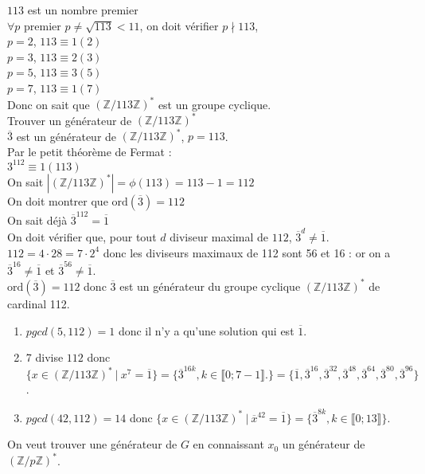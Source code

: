 \documentclass[a4paper,10pt]{book} %
\newcommand{\Z}{\mathbb{Z}}
\newcommand{\abs}[1]{\left|#1\right|}
\newcommand{\tq}{~|~}
\newcommand{\ord}{\mathrm{ord}}
\begin{document}
$113$ est un nombre premier \\
$\forall p$ premier $p\neq \sqrt{113} < 11$, on doit vérifier $p \nmid 113$,\\
$p=2$, $113 \equiv 1(2)$\\
$p=3$, $113 \equiv 2(3)$\\
$p=5$, $113 \equiv 3(5)$\\
$p=7$, $113 \equiv 1(7)$\\
Donc on sait que $(\Z/113\Z)^*$ est un groupe cyclique.\\
Trouver un générateur de $(\Z/113\Z)^*$ \\
$\overline{3}$ est un générateur de $(\Z/113\Z)^*$, $p=113$.\\
Par le petit théorème de Fermat :\\
$3^112 \equiv 1(113)$\\
On sait $\abs{(\Z/113\Z)^*} = \phi(113)=113-1=112$\\
On doit montrer que $\ord(\overline{3})=112$ \\
On sait déjà $\overline{3}^112=\overline{1}$\\

On doit vérifier que, pour tout $d$ diviseur maximal de $112$, $\overline{3}^{d}\neq \overline{1}$.\\

$112=4\cdot 28=7\cdot 2^4$ donc les diviseurs maximaux de 112 sont 56 et 16 : or on a $\overline{3}^{16}\neq \overline{1}$ et $\overline{3}^{56}\neq \overline{1}$.\\

$\ord(\overline{3})=112$ donc $\overline{3}$ est un générateur du groupe cyclique $(\Z/113\Z)^*$ de cardinal 112.

\begin{enumerate}
\item $pgcd(5,112)=1$ donc il n'y a qu'une solution qui est $\overline{1}$.
\item 7 divise $112$ donc $\{x\in (\Z/113\Z)^* \tq x^7=\overline{1}\}=\{\overline{3}^{16k}, k\in \llbracket 0; 7-1\rrbracket. \}=\{\overline{1},\overline{3}^{16},\overline{3}^{32},\overline{3}^{48},\overline{3}^{64},\overline{3}^{80},\overline{3}^{96}\}$.
\item $pgcd(42,112)=14$ donc $\{x\in(\Z/113\Z)^*\tq \overline{x}^{42}=\overline{1}\}= \{\overline{3}^{8k},k\in\llbracket 0;13\rrbracket \}$.
\end{enumerate}

On veut trouver une générateur de $G$ en connaissant $x_0$ un générateur de $(\Z/p\Z)^*$.
\end{document}
